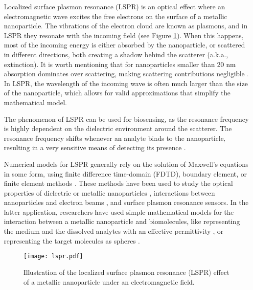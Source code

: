 
Localized surface plasmon resonance (LSPR) is an optical effect where an 
electromagnetic wave excites the free electrons on the surface of a metallic nanoparticle.
The vibrations of the electron cloud are known as plasmons, and in LSPR they resonate with the incoming
field (see Figure \ref{fig:lspr}). When this happens, most of the incoming energy is
either absorbed by the nanoparticle, or scattered in different directions, 
both creating a shadow behind the scatterer (a.k.a., extinction). It is worth mentioning
that for nanoparticles smaller than 20 nm absorption dominates over scattering, making scattering 
contributions negligible \cite{PetryayevaKrull2011, OlsonETal2015}. In LSPR, the 
wavelength of the incoming wave is often much larger than the size of the nanoparticle, 
which allows for valid approximations that simplify the mathematical model.

The phenomenon of LSPR can be used for biosensing, 
as the resonance frequency is highly dependent on the dielectric environment 
around the scatterer. 
The resonance frequency shifts whenever an analyte binds to the nanoparticle, 
resulting in a very sensitive means of detecting its presence \cite{HaesVanduyne2002,HaesETal2004}.

Numerical models for LSPR generally rely on the 
solution of Maxwell's equations in some form, using finite difference time-domain (FDTD),
boundary element, or finite element methods \cite{SolisTaboadaObelleiroLiz-MaarzanGarciadeabajo2014}. 
These methods have been used to study the 
optical properties of dielectric or metallic nanoparticles \cite{Hohenester2018,HohenesterTrugler2012,
JungPedersenSondergaardPedersenLarsenNielsen2010, VideenSun2003,
MayergoyzFredkinZhang2005, MayergoyzZhang2007}, interactions between nanoparticles
and electron beams \cite{GarciadeabajoAizpurua1997, GarciadeabajoHowie2002},
and surface plasmon resonance sensors.
In the latter application, researchers have used simple mathematical models for the 
interaction between a metallic nanoparticle and biomolecules,
like representing the medium and the dissolved analytes with an effective permittivity \cite{JungCampbellChinowskyMarYee1998,WilletsVandyune2007,PhanETal2013}, 
or representing the target molecules as spheres 
\cite{DavisGomezVernon2010,AntosiewiczApellClaudioKall2011}.


\begin{figure}
 \centering
   \texttt{[image: lspr.pdf]} 
   \caption{Illustration of the localized surface plasmon resonance (LSPR) effect of a metallic nanoparticle under an electromagnetic field.    \label{fig:lspr}}
  \end{figure}

